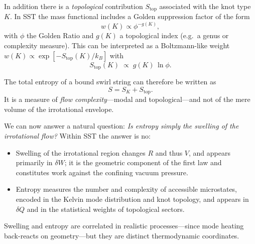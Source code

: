 \documentclass[11pt]{article}
\begin{document}
            In addition there is a \emph{topological} contribution
            $S_{\text{top}}$ associated with the knot type $K$.
            In SST the mass functional includes a Golden suppression factor of the
            form
            \begin{equation}
                w(K) \propto \phi^{-g(K)},
            \end{equation}
            with $\phi$ the Golden Ratio and $g(K)$ a topological index (e.g.\ a
            genus or complexity measure).
            This can be interpreted as a Boltzmann-like weight
            $w(K) \propto \exp[-S_{\text{top}}(K)/k_B]$ with
            \begin{equation}
                S_{\text{top}}(K) \;\propto\; g(K)\,\ln \phi.
            \end{equation}

            The total entropy of a bound swirl string can therefore be written as
            \begin{equation}
                S = S_K + S_{\text{top}}.
            \end{equation}
            It is a measure of \emph{flow complexity}---modal and topological---and
            not of the mere volume of the irrotational envelope.

            We can now answer a natural question:
            \emph{Is entropy simply the swelling of the irrotational flow?}
            Within SST the answer is no:
            \begin{itemize}
                \item Swelling of the irrotational region changes $R$ and thus $V$,
                and appears primarily in $\delta W$; it is the geometric component
                of the first law and constitutes work against the confining vacuum
                pressure.

                \item Entropy measures the number and complexity of accessible
                microstates, encoded in the Kelvin mode distribution and knot
                topology, and appears in $\delta Q$ and in the statistical weights
                of topological sectors.
            \end{itemize}
            Swelling and entropy are correlated in realistic processes---since
            mode heating back-reacts on geometry---but they are distinct
            thermodynamic coordinates.

\end{document}
